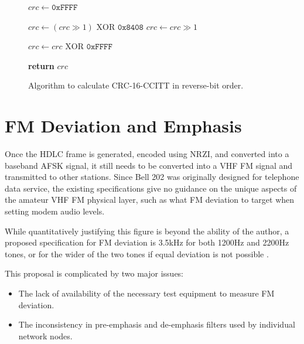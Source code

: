\documentclass[12pt,letterpaper]{article}
\begin{document}
\begin{figure}
	\begin{center}
	\begin{algorithmic}[1]
		\State $crc \gets \texttt{0xFFFF}$

			\State $crc \gets (crc \gg 1) \textrm{ XOR } \texttt{0x8408}$
		\Else
			\State $crc \gets crc \gg 1$
		\EndIf
		\EndFor
		\EndFor

		\State $crc \gets crc \textrm{ XOR } \texttt{0xFFFF}$

		\State \textbf{return} $crc$
		\EndFunction
	\end{algorithmic}
	\caption{Algorithm to calculate CRC-16-CCITT in reverse-bit order.}
	\end{center}
	\label{fig:crcccittcode}
\end{figure}

\section{FM Deviation and Emphasis}

Once the HDLC frame is generated, encoded using NRZI, and converted into
a baseband AFSK signal, it still needs to be converted into a VHF FM signal
and transmitted to other stations. 
Since Bell 202 was originally designed for telephone data service, 
the existing specifications give no guidance on the unique 
aspects of the amateur VHF FM physical layer, such as what 
FM deviation to target when setting modem audio levels.

While quantitatively justifying this figure is beyond the ability of the
author, a proposed specification for FM deviation is 3.5kHz for both
1200Hz and 2200Hz tones, or for the wider of the two tones if equal
deviation is not possible \cite{millerinterview}.

This proposal is complicated by two major issues: 
\begin{itemize}
	\item The lack of availability of the necessary 
		test equipment to measure FM deviation.
	\item The inconsistency in pre-emphasis and de-emphasis filters
		used by individual network nodes.
\end{itemize}
\end{document}

